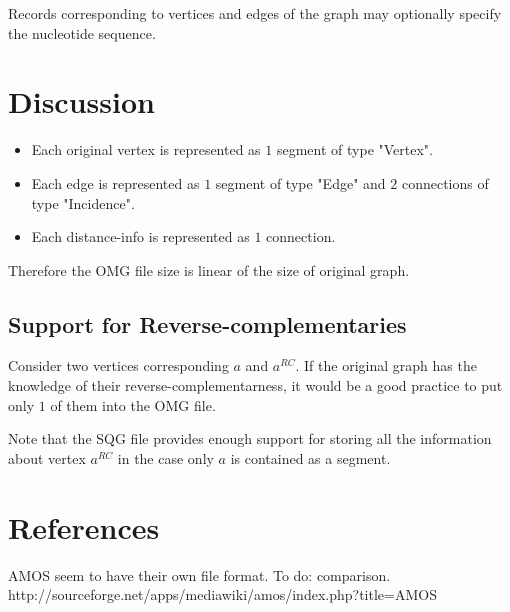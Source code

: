 \documentclass[12pt]{article}
\begin{document}
Records corresponding to vertices and edges of the graph
may optionally specify the nucleotide sequence.

\section{Discussion}

\begin{itemize}
\item Each original vertex is represented as $1$ segment of type "Vertex".
\item Each edge is represented as $1$ segment of type "Edge" and $2$ connections of type "Incidence".
\item Each distance-info is represented as $1$ connection.
\end{itemize}

Therefore the OMG file size is linear of the size of original graph.

\subsection{Support for Reverse-complementaries}

Consider two vertices corresponding $a$ and $a^{RC}$.
If the original graph has the knowledge of their reverse-complementarness,
it would be a good practice to put only $1$ of them into the OMG file.

Note that the SQG file provides enough support for storing all the information about
vertex $a^{RC}$ in the case only $a$ is contained as a segment.

\section{References}

AMOS seem to have their own file format. To do: comparison.\\
http://sourceforge.net/apps/mediawiki/amos/index.php?title=AMOS
\end{document}
